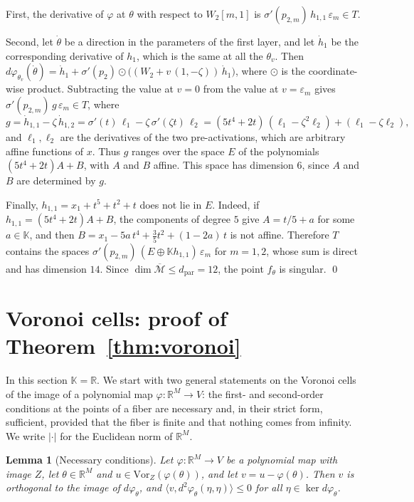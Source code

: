 \documentclass[11pt]{article}
\newtheorem{lemma}{Lemma}
\theoremstyle{definition}
\theoremstyle{remark}
\newcommand{\K}{\mathbb{K}}
\newcommand{\R}{\mathbb{R}}
\newcommand{\M}{\mathcal{M}}
\newcommand{\Mbar}{\overline{\M}}
\newcommand{\dpar}{d_{\mathrm{par}}}
\begin{document}
First, the derivative of $\varphi$ at $\theta$ with respect to $W_2[m,1]$ is $\sigma'(p_{2,m})\,h_{1,1}\,\varepsilon_m\in T$.

Second, let $\dot\theta$ be a direction in the parameters of the first layer, and let $\dot h_1$ be the corresponding derivative of $h_1$, which is the same at all the $\theta_v$. Then $d\varphi_{\theta_v}(\dot\theta)=\dot h_1+\sigma'(p_2)\odot\big((W_2+v\,(1,-\zeta))\,\dot h_1\big)$, where $\odot$ is the coordinate-wise product. Subtracting the value at $v=0$ from the value at $v=\varepsilon_m$ gives $\sigma'(p_{2,m})\,g\,\varepsilon_m\in T$, where
\[
g=\dot h_{1,1}-\zeta\,\dot h_{1,2}=\sigma'(t)\,\ell_1-\zeta\,\sigma'(\zeta t)\,\ell_2=(5t^4+2t)\,(\ell_1-\zeta^2\ell_2)+(\ell_1-\zeta\ell_2),
\]
and $\ell_1,\ell_2$ are the derivatives of the two pre-activations, which are arbitrary affine functions of $x$. Thus $g$ ranges over the space $E$ of the polynomials $(5t^4+2t)A+B$, with $A$ and $B$ affine. This space has dimension $6$, since $A$ and $B$ are determined by $g$.

Finally, $h_{1,1}=x_1+t^5+t^2+t$ does not lie in $E$. Indeed, if $h_{1,1}=(5t^4+2t)A+B$, the components of degree $5$ give $A=t/5+a$ for some $a\in\K$, and then $B=x_1-5a\,t^4+\tfrac35t^2+(1-2a)\,t$ is not affine. Therefore $T$ contains the spaces $\sigma'(p_{2,m})\,(E\oplus\K h_{1,1})\,\varepsilon_m$ for $m=1,2$, whose sum is direct and has dimension $14$. Since $\dim\Mbar\le\dpar=12$, the point $f_\theta$ is singular. \qed

\section{Voronoi cells: proof of Theorem~\ref{thm:voronoi}}\label{sec:voronoi}

In this section $\K=\R$. We start with two general statements on the Voronoi cells of the image of a polynomial map $\varphi\colon\R^M\to V$: the first- and second-order conditions at the points of a fiber are necessary and, in their strict form, sufficient, provided that the fiber is finite and that nothing comes from infinity. We write $|\cdot|$ for the Euclidean norm of $\R^M$.

\begin{lemma}[Necessary conditions]\label{lem:necessary}
Let $\varphi\colon\R^M\to V$ be a polynomial map with image $Z$, let $\theta\in\R^M$ and $u\in\mathrm{Vor}_Z(\varphi(\theta))$, and let $v=u-\varphi(\theta)$. Then $v$ is orthogonal to the image of $d\varphi_\theta$, and $\langle v,d^2\varphi_\theta(\eta,\eta)\rangle\le0$ for all $\eta\in\ker d\varphi_\theta$.
\end{lemma}
\end{document}
